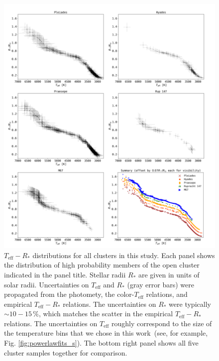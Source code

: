 \documentclass{aa}
\begin{document}
   \begin{figure}
		\centering
           \includegraphics[width=1.015\hsize]{pics/clusters/teff_R.png}

      \caption{$T_\mathrm{eff}-R_*$ distributions for all clusters in this study. Each panel shows the distribution of high probability members of the open cluster indicated in the panel title. Stellar radii $R_*$ are given in units of solar radii. Uncertainties on $T_\mathrm{eff}$ and $R_*$ (gray error bars) were propagated from the photomety, the color-$T_\mathrm{eff}$ relations, and empirical $T_\mathrm{eff}-R_*$ relations. The uncertainties on $R_*$ were typically $\sim10-15$\,\%, which matches the scatter in the empirical $T_\mathrm{eff}-R_*$ relations. The uncertainties on $T_\mathrm{eff}$ roughly correspond to the size of the temperature bins that we chose in this work~(see, for example, Fig. \ref{fig:powerlawfits_s}). The bottom right panel shows all five cluster samples together for comparison.}
         \label{fig:teff_radius}
         
   \end{figure}

   
\end{document}
